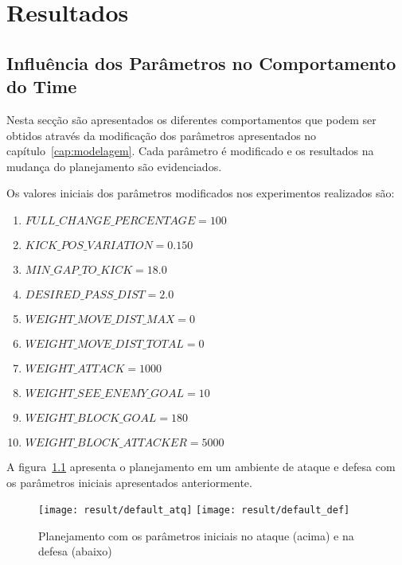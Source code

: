 \chapter{Resultados}\label{cap:resultados}



\section{Influência dos Parâmetros no Comportamento do Time}

Nesta secção são apresentados os diferentes comportamentos
que podem ser obtidos através da modificação dos parâmetros
apresentados no capítulo~\ref{cap:modelagem}. Cada parâmetro
é modificado e os resultados na mudança do planejamento são
evidenciados.

Os valores iniciais dos parâmetros modificados nos experimentos
realizados são:

\begin{enumerate}
  \item $FULL{\_}CHANGE{\_}PERCENTAGE = 100$
  \item $KICK{\_}POS{\_}VARIATION = 0.150$
  \item $MIN{\_}GAP{\_}TO{\_}KICK = 18.0$
  \item $DESIRED{\_}PASS{\_}DIST = 2.0$
  \item $WEIGHT{\_}MOVE{\_}DIST{\_}MAX = 0$
  \item $WEIGHT{\_}MOVE{\_}DIST{\_}TOTAL = 0$
  \item $WEIGHT{\_}ATTACK = 1000$
  \item $WEIGHT{\_}SEE{\_}ENEMY{\_}GOAL = 10$
  \item $WEIGHT{\_}BLOCK{\_}GOAL = 180$
  \item $WEIGHT{\_}BLOCK{\_}ATTACKER = 5000$
\end{enumerate}

A figura~\ref{fig:default} apresenta o planejamento em um
ambiente de ataque e defesa com os parâmetros iniciais
apresentados anteriormente.

\begin{figure}[H]
  \centering
  \texttt{[image: result/default\_atq]}
  \texttt{[image: result/default\_def]}
  \caption{Planejamento com os parâmetros iniciais no
           ataque (acima) e na defesa (abaixo)}\label{fig:default}
\end{figure}









